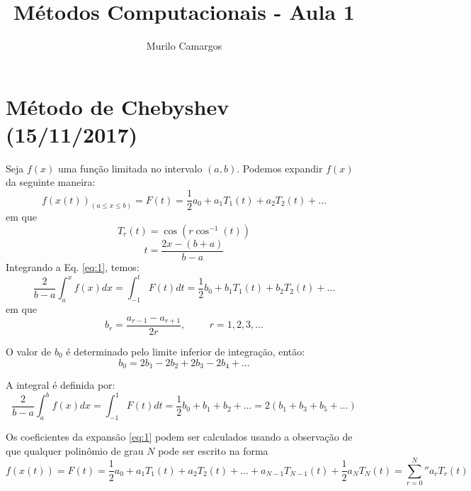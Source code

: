\documentclass[10pt,a4paper]{article}
\author{Murilo Camargos}
\title{Métodos Computacionais - Aula 1}
\begin{document}


	\section{Método de Chebyshev (15/11/2017)}
	Seja $f(x)$ uma função limitada no intervalo $(a,b)$. Podemos expandir $f(x)$ da seguinte maneira:
	\begin{equation}
		f(x(t))_{(a\leq x\leq b)} = F(t) = \frac{1}{2}a_0 + a_1T_1(t) + a_2T_2(t) + \dots
		\label{eq:1}
	\end{equation}
	em que
	\[T_r(t) = \cos{\left(r \cos^{-1}{(t)}\right)}\]
	\[t = \frac{2x - (b+a)}{b-a}\]
	Integrando a Eq. \ref{eq:1}, temos:
	\begin{equation}
		\frac{2}{b-a}\int_a^xf(x)dx = \int_{-1}^tF(t)dt = \frac{1}{2}b_0+b_1T_1(t)+b_2T_2(t)+\dots
		\label{eq:2}
	\end{equation}
	em que
	\[b_r = \frac{a_{r-1}-a_{r+1}}{2r}, \hspace{1cm} r=1,2,3,\dots\]
	
	O valor de $b_0$ é determinado pelo limite inferior de integração, então:
	\[b_0 = 2b_1 - 2b_2 + 2b_3 - 2b_4 + \dots\]
	
	A integral é definida por:
	\begin{equation}
		\frac{2}{b-a}\int_a^bf(x)dx = \int_{-1}^1F(t)dt = \frac{1}{2}b_0+b_1+b_2+\dots = 2\left(b_1+b_3+b_5+\dots\right)
		\label{eq:3}
	\end{equation}
	
	Os coeficientes da expansão \ref{eq:1} podem ser calculados usando a observação de que qualquer polinômio de grau $N$ pode ser escrito na forma
	\begin{equation}
		f(x(t)) = F(t) = \frac{1}{2}a_0+a_1T_1(t)+a_2T_2(t)+\dots+a_{N-1}T_{N-1}(t)+\frac{1}{2}a_NT_N(t) = {\sum_{r=0}^N}'' a_rT_r(t)
		\label{eq:4}
	\end{equation}
	
\end{document}
